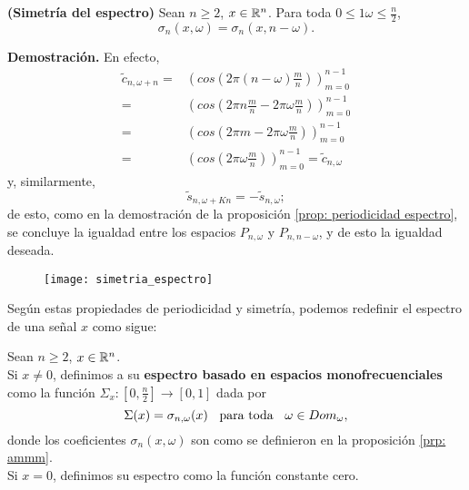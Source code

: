 \begin{prop}
\textbf{(Simetría del espectro)}
Sean
$n \geq 2$,
$x \in \mathbb{R}^{n}$. Para toda $0 \leq1 \omega \leq \frac{n}{2}$,
\[
\sigma_{n}(x, \omega) = 
\sigma_{n}(x, n-\omega ). 
\]
\end{prop}
\noindent
\textbf{Demostración.}
En efecto, 
\begin{align*}
\tilde{c}_{n, \omega + n} = & \left( cos \left( 2 \pi
\left( n- \omega \right) \frac{m}{n} \right) \right)_{m=0}^{n-1} \\
= & \left( cos \left( 
2 \pi n \frac{m}{n} - 2 \pi \omega
\frac{m}{n}
\right) \right)_{m=0}^{n-1} \\
= & \left( cos \left( 
2 \pi m - 2 \pi \omega \frac{m}{n} 
\right) \right)_{m=0}^{n-1} \\
= & \left( cos \left( 2 \pi \omega \frac{m}{n} \right) \right)_{m=0}^{n-1}
= \tilde{c}_{n, \omega}
\end{align*}
y, similarmente,
\[
\tilde{s}_{n, \omega + Kn} = -\tilde{s}_{n, \omega};
\]
de esto, como en la demostración de la proposición
\ref{prop: periodicidad espectro}, se concluye la igualdad
entre los espacios $P_{n, \omega}$ y $P_{n, n-\omega}$, y de esto
la igualdad deseada.
\QEDB
\vspace{0.2cm}

\begin{figure}[H]
	\centering
	\texttt{[image: simetria\_espectro]} 
\end{figure}	

Según estas propiedades de periodicidad y simetría,
podemos redefinir el espectro de una señal $x$
como sigue:
\begin{defi}
\label{def: espectro monofrecuenciales}
Sean $n \geq 2$, $x \in \mathbb{R}^{n}$.\\

Si $x \neq 0$, definimos a su \textbf{espectro basado en 
espacios monofrecuenciales} como la función 
$\Sigma_{x}: [0, \frac{n}{2}] \longrightarrow [0,1]$
dada por
\[
\Sigma(x) = \sigma_{n, \omega} (x) \hspace{0.2cm}
\text{ para toda }
\hspace{0.2cm} \omega \in Dom_{\omega},
\]
donde los coeficientes
$\sigma_{n}(x, \omega)$ son como se definieron en 
la proposición \ref{prp: ammm}. \\

Si $x = 0$, definimos su espectro como la 
función
constante cero.
\end{defi}

